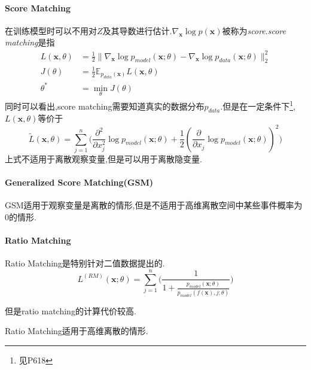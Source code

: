 \paragraph{Score Matching}在训练模型时可以不用对$Z$及其导数进行估计.$\nabla_{\mathbf x}\log p(\mathbf x)$被称为\textit{score}.\textit{score matching}是指
\begin{equation}\begin{split}
L(\mathbf x,\theta)&=\frac{1}{2}\|\nabla_{\mathbf x}\log p_{model}(\mathbf x;\theta)-\nabla_{\mathbf x}\log p_{data}(\mathbf x;\theta)\|_2^2\\
J(\theta)&=\frac{1}{2}\mathbb E_{p_{data}(\mathbf x)}L(\mathbf x,\theta)\\
\theta^\ast&=\min_\theta J(\theta)
\end{split}\end{equation}
同时可以看出,score matching需要知道真实的数据分布$p_{data}$.但是在一定条件下\footnote{见P618},$L(\mathbf x,\theta)$等价于
\begin{equation}
\tilde L(\mathbf x,\theta)=\sum_{j=1}^n\Big(\frac{\partial^2}{\partial x_j^2}\log p_{model}(\mathbf x;\theta)+\frac{1}{2}(\frac{\partial}{\partial x_j}\log p_{model}(\mathbf x;\theta))^2\Big)
\end{equation}
上式不适用于离散观察变量,但是可以用于离散隐变量.

\paragraph{Generalized Score Matching(GSM)}GSM适用于观察变量是离散的情形,但是不适用于高维离散空间中某些事件概率为$0$的情形.

\paragraph{Ratio Matching} Ratio Matching是特别针对二值数据提出的.
\begin{equation}
L^{(RM)}(\mathbf x;\theta)=\sum_{j=1}^n\Big(\frac{1}{1+\frac{p_{model}(\mathbf x;\theta)}{p_{model}(f(\mathbf x), j;\theta)}}\Big)
\end{equation}

但是ratio matching的计算代价较高.

Ratio Matching适用于高维离散的情形.